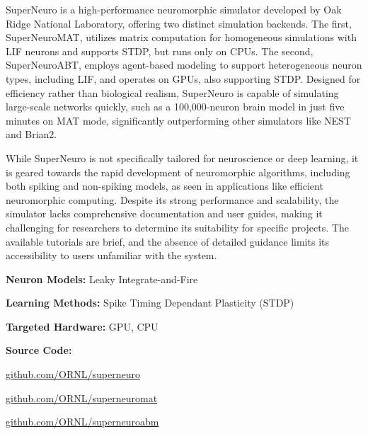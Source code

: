 SuperNeuro is a high-performance neuromorphic simulator developed by Oak Ridge National Laboratory, offering two distinct simulation backends. The first, SuperNeuroMAT, utilizes matrix computation for homogeneous simulations with LIF neurons and supports STDP, but runs only on CPUs. The second, SuperNeuroABT, employs agent-based modeling to support heterogeneous neuron types, including LIF, and operates on GPUs, also supporting STDP. Designed for efficiency rather than biological realism, SuperNeuro is capable of simulating large-scale networks quickly, such as a 100,000-neuron brain model in just five minutes on MAT mode, significantly outperforming other simulators like NEST and Brian2.

While SuperNeuro is not specifically tailored for neuroscience or deep learning, it is geared towards the rapid development of neuromorphic algorithms, including both spiking and non-spiking models, as seen in applications like efficient neuromorphic computing. Despite its strong performance and scalability, the simulator lacks comprehensive documentation and user guides, making it challenging for researchers to determine its suitability for specific projects. The available tutorials are brief, and the absence of detailed guidance limits its accessibility to users unfamiliar with the system.

\begin{tcolorbox}[enhanced,attach boxed title to top center={yshift=-3mm,yshifttext=-1mm}, colback=blue!5!white,colframe=blue!75!black,colbacktitle=red!80!black, title=SuperNeuro at a Glance,fonttitle=\bfseries, boxed title style={size=small,colframe=red!50!black} ]

\textbf{Neuron Models:} Leaky Integrate-and-Fire

\textbf{Learning Methods:} Spike Timing Dependant Plasticity (STDP)  

\textbf{Targeted Hardware:} GPU, CPU 

\textbf{Source Code:} 

\href{https://github.com/ORNL/superneuro}{github.com/ORNL/superneuro}

\href{https://github.com/ORNL/superneuromat}{github.com/ORNL/superneuromat}

\href{https://github.com/ORNL/superneuroabm}{github.com/ORNL/superneuroabm}
\end{tcolorbox}
